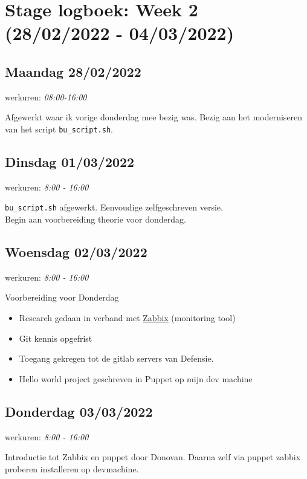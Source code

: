 
\hypertarget{stage-logboek-week-2-28022022---04032022}{%
\section{Stage logboek: Week 2 (28/02/2022 -
04/03/2022)}\label{stage-logboek-week-2-28022022---04032022}}

\hypertarget{maandag-28022022}{%
\subsection{Maandag 28/02/2022}\label{maandag-28022022}}

werkuren: \emph{08:00-16:00}

Afgewerkt waar ik vorige donderdag mee bezig was. Bezig aan het
moderniseren van het script \texttt{bu\_script.sh}.

\hypertarget{dinsdag-01032022}{%
\subsection{Dinsdag 01/03/2022}\label{dinsdag-01032022}}

werkuren: \emph{8:00 - 16:00}

\texttt{bu\_script.sh} afgewerkt. Eenvoudige zelfgeschreven versie.\\
Begin aan voorbereiding theorie voor donderdag.

\hypertarget{woensdag-02032022}{%
\subsection{Woensdag 02/03/2022}\label{woensdag-02032022}}

werkuren: \emph{8:00 - 16:00}

Voorbereiding voor Donderdag

\begin{itemize}
\tightlist
\item
  Research gedaan in verband met
  \href{https://www.zabbix.com/documentation/5.0/en/manual/introduction/about}{Zabbix}
  (monitoring tool)
\item
  Git kennis opgefrist
\item
  Toegang gekregen tot de gitlab servers van Defensie.
\item
  Hello world project geschreven in Puppet op mijn dev machine
\end{itemize}

\hypertarget{donderdag-03032022}{%
\subsection{Donderdag 03/03/2022}\label{donderdag-03032022}}

werkuren: \emph{8:00 - 16:00}

Introductie tot Zabbix en puppet door Donovan. Daarna zelf via puppet
zabbix proberen installeren op devmachine.

